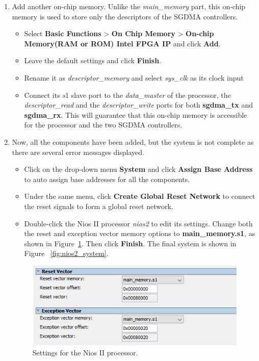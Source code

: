 \documentclass[11pt, twoside, pdftex]{article}
\begin{document}
\begin{enumerate}
	\item Add another on-chip memory. Unlike the {\it main\_memory} part, this on-chip memory is used to store only the descriptors of the SGDMA controllers.
		\begin{itemize}
			\item Select {\bf Basic Functions} > {\bf On Chip Memory} > {\bf On-chip Memory(RAM or ROM) Intel FPGA IP} and click {\bf Add}.
			\item Leave the default settings and click {\bf Finish}. 
			\item Rename it as {\it descriptor\_memory} and select {\it sys\_clk} as its clock input
			\item Connect its {\it s}1 slave port to the {\it data\_master} of the processor, the {\it descriptor\_read} and the {\it descriptor\_write} ports for both {\bf sgdma\_tx} and {\bf sgdma\_rx}. This will guarantee that this on-chip memory is accessible for the processor and the two SGDMA controllers. 
		\end{itemize}
	
	\item Now, all the components have been added, but the system is not complete as there are several error messages displayed. 
		\begin{itemize}
			\item Click on the drop-down menu {\bf System} and click {\bf Assign Base Address} to auto assign base addresses for all the components.
			\item Under the same menu, click {\bf Create Global Reset Network} to connect the reset signals to form a global reset network.
			\item Double-click the Nios II processor {\it nios2} to edit its settings.  Change both the reset and exception vector memory options to {\bf main\_memory.s1}, as shown in Figure~\ref{fig:nios2_settings}. Then click {\bf Finish}.	The final system is shown in Figure ~\ref{fig:nios2_system}.
		\end{itemize}

		\begin{figure}[H]
			\centering
			  \includegraphics[scale=0.55]{figures/nios2_settings.png}
			\caption{Settings for the Nios II processor.} 
			\label{fig:nios2_settings}
		\end{figure}
	

\end{enumerate}
\end{document}

